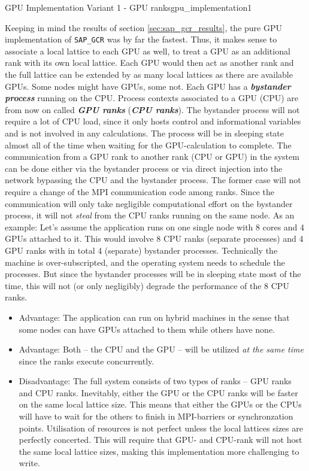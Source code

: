 \documentclass{article}
\theoremstyle{plain} %
\theoremstyle{convention} %
\theoremstyle{remark} %
\def\code#1{\texttt{#1}}
\def\df#1{\textbf{\textit{#1}}}
\numberwithin{equation}{section}
\begin{document}
\begin{proposal}{GPU Implementation Variant 1 - GPU ranks}{gpu_implementation1} %

Keeping in mind the results of section \ref{sec:sap_gcr_results}, the pure GPU implementation of \code{SAP\_GCR} was by far the fastest. Thus, it makes sense to associate a local lattice to each GPU as well, to treat a GPU as an additional rank with its own local lattice. Each GPU would then act as another rank and the full lattice can be extended by as many local lattices as there are available GPUs. Some nodes might have GPUs, some not. Each GPU has a \df{bystander process} running on the CPU. Process contexts associated to a GPU (CPU) are from now on called \df{GPU ranks} (\df{CPU ranks}). The bystander process will not require a lot of CPU load, since it only hosts control and informational variables and is not involved in any calculations. The process will be in sleeping state almost all of the time when waiting for the GPU-calculation to complete. The communication from a GPU rank to another rank (CPU or GPU) in the system can be done either via the bystander process or via direct injection into the network bypassing the CPU and the bystander process. The former case will not require a change of the MPI communication code among ranks. Since the communication will only take negligible computational effort on the bystander process, it will not \textit{steal} from the CPU ranks running on the same node. As an example: Let's assume the application runs on one single node with \num{8} cores and \num{4} GPUs attached to it. This would involve \num{8} CPU ranks (separate processes) and \num{4} GPU ranks with in total \num{4} (separate) bystander processes. Technically the machine is over-subscripted, and the operating system needs to schedule the processes. But since the bystander processes will be in sleeping state most of the time, this will not (or only negligibly) degrade the performance of the \num{8} CPU ranks.

\begin{itemize}
    \item Advantage: The application can run on hybrid machines in the sense that some nodes can have GPUs attached to them while others have none.
    \item Advantage: Both -- the CPU and the GPU -- will be utilized \textit{at the same time} since the ranks execute concurrently.
    \item Disadvantage: The full system consists of two types of ranks -- GPU ranks and CPU ranks. Inevitably, either the GPU or the CPU ranks will be faster on the same local lattice size. This means that either the GPUs or the CPUs will have to wait for the others to finish in MPI-barriers or synchronzation points. Utilisation of resources is not perfect unless the local lattices sizes are perfectly concerted. This will require that GPU- and CPU-rank will not host the same local lattice sizes, making this implementation more challenging to write.
\end{itemize}

\end{proposal}
\end{document}

